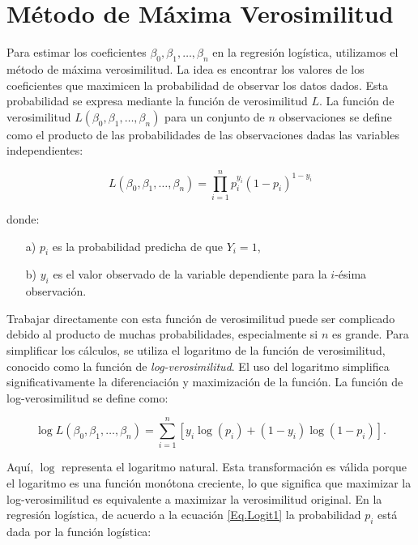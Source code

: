 \documentclass[a4paper]{report} %
\begin{document}
\section{Método de Máxima Verosimilitud}

Para estimar los coeficientes $\beta_0, \beta_1, \ldots, \beta_n$ en la regresión logística, utilizamos el método de máxima verosimilitud. La idea es encontrar los valores de los coeficientes que maximicen la probabilidad de observar los datos dados. Esta probabilidad se expresa mediante la función de verosimilitud $L$. La función de verosimilitud $L(\beta_0, \beta_1, \ldots, \beta_n)$ para un conjunto de $n$ observaciones se define como el producto de las probabilidades de las observaciones dadas las variables independientes:

\begin{equation}\label{Eq.Verosimilitud}
L(\beta_0, \beta_1, \ldots, \beta_n) = \prod_{i=1}^{n} p_i^{y_i} (1 - p_i)^{1 - y_i}
\end{equation}

donde:
\begin{itemize}
    \item[a) ] $p_i$ es la probabilidad predicha de que $Y_i = 1$,
    \item[b) ] $y_i$ es el valor observado de la variable dependiente para la $i$-ésima observación.
\end{itemize}

Trabajar directamente con esta función de verosimilitud puede ser complicado debido al producto de muchas probabilidades, especialmente si $n$ es grande. Para simplificar los cálculos, se utiliza el logaritmo de la función de verosimilitud, conocido como la función de \textit{log-verosimilitud}. El uso del logaritmo simplifica significativamente la diferenciación y maximización de la función. La función de log-verosimilitud se define como:

\begin{equation}\label{Funcion.LogVerosimilitud}
\log L(\beta_0, \beta_1, \ldots, \beta_n) = \sum_{i=1}^{n} \left[ y_i \log(p_i) + (1 - y_i) \log(1 - p_i) \right].
\end{equation}

Aquí, $\log$ representa el logaritmo natural. Esta transformación es válida porque el logaritmo es una función monótona creciente, lo que significa que maximizar la log-verosimilitud es equivalente a maximizar la verosimilitud original. En la regresión logística, de acuerdo a la ecuaci\'on \ref{Eq.Logit1} la probabilidad $p_i$ está dada por la función logística:
\end{document}
